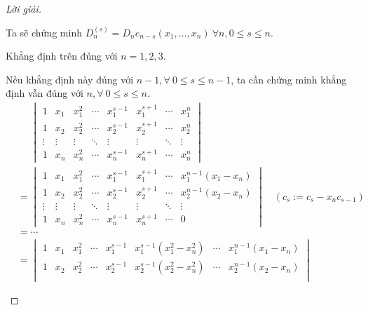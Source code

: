 \documentclass[class=linear-algebra,crop=false]{standalone}
\begin{document}
\begin{proof}[Lời giải]
\begin{enumerate}[label = (\alph*)]
		      \par Ta sẽ chứng minh $D_{n}^{(s)} = D_{n}e_{n-s}(x_{1},\ldots, x_{n})\ \forall n, 0\le s\le n$.
		      \par Khẳng định trên đúng với $n = 1, 2, 3$.
		      \par Nếu khẳng định này đúng với $n - 1, \forall\ 0\le s\le n-1$, ta cần chứng minh khẳng định vẫn đúng với $n, \forall\ 0\le s\le n$.
		      \begin{align*}
			       & \phantom{=}\begin{vmatrix}
				                    1      & x_{1}  & x_{1}^{2} & \cdots & x_{1}^{s-1} & x_{1}^{s+1} & \cdots & x_{1}^{n} \\
				                    1      & x_{2}  & x_{2}^{2} & \cdots & x_{2}^{s-1} & x_{2}^{s+1} & \cdots & x_{2}^{n} \\
				                    \vdots & \vdots & \vdots    & \ddots & \vdots      & \vdots      & \ddots & \vdots    \\
				                    1      & x_{n}  & x_{n}^{2} & \cdots & x_{n}^{s-1} & x_{n}^{s+1} & \cdots & x_{n}^{n}
			                    \end{vmatrix}                                          \\
			       & =
			      \begin{vmatrix}
				      1      & x_{1}  & x_{1}^{2} & \cdots & x_{1}^{s-1} & x_{1}^{s+1} & \cdots & x_{1}^{n-1}(x_{1} - x_{n}) \\
				      1      & x_{2}  & x_{2}^{2} & \cdots & x_{2}^{s-1} & x_{2}^{s+1} & \cdots & x_{2}^{n-1}(x_{2} - x_{n}) \\
				      \vdots & \vdots & \vdots    & \ddots & \vdots      & \vdots      & \ddots & \vdots                     \\
				      1      & x_{n}  & x_{n}^{2} & \cdots & x_{n}^{s-1} & x_{n}^{s+1} & \cdots & 0
			      \end{vmatrix}\quad(c_{s}:=c_{s} - x_{n}c_{s-1})                                       \\
			       & = \cdots                                                                                                                                  \\
			       & =
			      \begin{vmatrix}
				      1      & x_{1}  & x_{1}^{2} & \cdots & x_{1}^{s-1} & x_{1}^{s-1}(x_{1}^{2} - x_{n}^{2}) & \cdots & x_{1}^{n-1}(x_{1} - x_{n}) \\
				      1      & x_{2}  & x_{2}^{2} & \cdots & x_{2}^{s-1} & x_{2}^{s-1}(x_{2}^{2} - x_{n}^{2}) & \cdots & x_{2}^{n-1}(x_{2} - x_{n}) \\

\end{vmatrix}
\end{align*}
\end{enumerate}
\end{proof}
\end{document}

